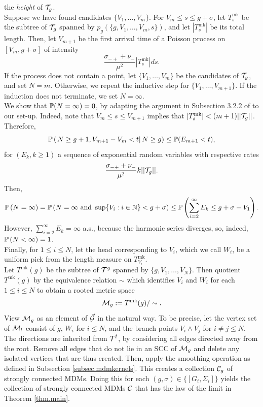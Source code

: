 the \emph{height} of $\cT_g$. \\
Suppose we have found candidates $\{V_1,\dots,V_m\}$. For $V_m\leq s\leq g+\sigma$, let $T^{\mathrm{mk}}_s$ be the subtree of $\cT_g$ spanned by $p_g\left(\{g,V_1,\dots,V_m,s\}\right)$, and let $|T^{\mathrm{mk}}_s|$ be its total length. Then, let $V_{m+1}$ be the first arrival time of a Poisson process on $[V_m,g+\sigma]$ of intensity $$\frac{\sigma_{-+}+\nu_-}{\mu^2}|T^{\mathrm{mk}}_s|ds.$$ If the process does not contain a point, let $\{V_1,\dots,V_m\}$ be the candidates of $\cT_g$, and set $N=m$. Otherwise, we repeat the inductive step for $\{V_1,\dots,V_{m+1}\}.$ If the induction does not terminate, we set $N=\infty$.\\
We show that $\P(N=\infty)=0$, by adapting the argument in Subsection 3.2.2 of \cite{goldschmidtScalingLimitCritical2021} to our set-up. Indeed, note that $V_m\leq s\leq V_{m+1}$ implies that  $|T^{\mathrm{mk}}_s|<(m+1)||\cT_g||$. Therefore, 
$$\P\left(\left.N\geq g+1,V_{m+1}-V_m<t \right|N\geq g\right)\leq \P(E_{m+1}<t),$$
for $(E_{k},k\geq 1)$ a sequence of exponential random variables with respective rates $$\frac{\sigma_{-+}+\nu_-}{\mu^2}k||\cT_g||.$$ 
Then,
$$\P\left(N=\infty \right)=\P\left(N=\infty\text{ and }\sup\{V_i:i\in \N\}<g+\sigma\right)\leq \P\left(\sum_{i=2}^\infty E_k\leq g+\sigma-V_1\right).$$
However, $\sum_{i=2}^\infty E_k=\infty$ a.s., because the harmonic series diverges, so, indeed, $\P\left(N<\infty \right)=1$. \\
Finally, for $1\leq i \leq N$, let the head corresponding to $V_i$, which we call $W_i$, be a uniform pick from the length measure on $T^{\mathrm{mk}}_{V_i}$. \\
Let $T^{\mathrm{mk}}(g)$ be the subtree of $\cT^{g}$ spanned by $\{g,V_1,\dots,V_N\}$. Then quotient $T^{\mathrm{mk}}(g)$ by the equivalence relation $\sim$ which identifies  $V_i$ and $W_i$ for each $1\leq i\leq N$ to obtain a rooted metric space $$\cM_{g}:=T^{\mathrm{mk}}(g)/\sim.$$ 
View $\cM_{g}$ as an element of $\vec{\cG}$ in the natural way. To be precise,  let the vertex set of $\cM_l$ consist of $g$, $W_i$ for $i\leq N$, and the branch points $V_i\wedge V_j$ for $i\neq j\leq N$. The directions are inherited from $\cT^l$, by considering all edges directed away from the root. Remove all edges that do not lie in an SCC of $\cM_{g}$ and delete any isolated vertices that are thus created. Then, apply the smoothing operation as defined in Subsection \ref{subsec.mdmkernels}. This creates a collection $\cC_g$ of strongly connected MDMs. Doing this for each $(g,\sigma)\in \{[G_i,\Sigma_i]\}$ yields the collection of strongly connected MDMs $\cC$ that has the law of the limit in Theorem \ref{thm.main}.

